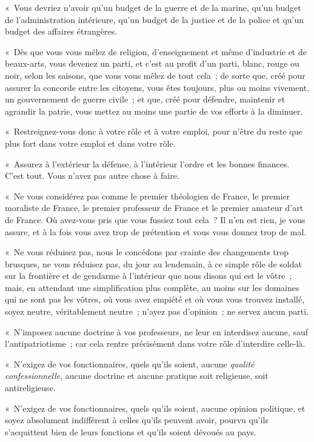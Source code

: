 \documentclass[french,twoside]{book} %
\begin{document}
« Vous devriez n’avoir qu’un budget de la guerre et de la marine, qu’un budget de l’administration intérieure, qu’un budget de la justice et de la police et qu’un budget des affaires étrangères.\par
« Dès que vous vous mêlez de religion, d’enseignement et même d’industrie et de beaux-arts, vous devenez un parti, et c’est au profit d’un parti, blanc, rouge ou noir, selon les saisons, que vous vous mêlez de tout cela ; de sorte que, créé pour assurer la concorde entre les citoyens, vous êtes toujours, plus ou moins vivement, un gouvernement de guerre civile ; et que, créé pour défendre, maintenir et agrandir la patrie, vous mettez au moins une partie de vos efforts à la diminuer.\par
« Restreignez-vous donc à votre rôle et à votre emploi, pour n’être du reste que plus fort dans votre emploi et dans votre rôle.\par
« Assurez à l’extérieur la défense, à l’intérieur  l’ordre et les bonnes finances. C’est tout. Vous n’avez pas autre chose à faire.\par
« Ne vous considérez pas comme le premier théologien de France, le premier moraliste de France, le premier professeur de France et le premier amateur d’art de France. Où avez-vous pris que vous fussiez tout cela ? Il n’en est rien, je vous assure, et à la fois vous avez trop de prétention et vous vous donnez trop de mal.\par
« Ne vous réduisez pas, nous le concédons par crainte des changements trop brusques, ne vous réduisez pas, du jour au lendemain, à ce simple rôle de soldat sur la frontière et de gendarme à l’intérieur que nous disons qui est le vôtre ; mais, en attendant une simplification plus complète, au moins sur les domaines qui ne sont pas les vôtres, où vous avez empiété et où vous vous trouvez installé, soyez neutre, véritablement neutre ; n’ayez pas d’opinion ; ne servez aucun parti.\par
« N’imposez aucune doctrine à vos professeurs, ne leur en interdisez aucune, sauf l’antipatriotisme ; car cela rentre précisément dans votre rôle d’interdire celle-là.\par
« N’exigez de vos fonctionnaires, quels qu’ils soient, aucune {\itshape qualité confessionnelle}, aucune doctrine et aucune pratique soit religieuse, soit antireligieuse.\par
 « N’exigez de vos fonctionnaires, quels qu’ils soient, aucune opinion politique, et soyez absolument indifférent à celles qu’ils peuvent avoir, pourvu qu’ils s’acquittent bien de leurs fonctions et qu’ils soient dévoués au pays.\par
\end{document}

